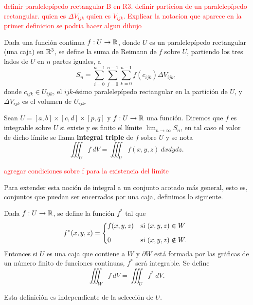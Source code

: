 \textcolor{red}{definir paralelep\'ipedo rectangular B en R3. }
\textcolor{red}{definir particion de un  paralelep\'ipedo rectangular. quien es $\Delta V_{ijk}$  quien es $V_{ijk}$. Explicar la notacion que aparece en la primer definicion }
\textcolor{red}{se podria hacer algun dibujo} 


\begin{definition}
Dada una funci\'on continua $f:U\to\mathbb{R}$, donde $U$ es un paralelep\'ipedo rectangular (una caja) en $\mathbb{R}^3$, se define la suma de Reimann de $f$ sobre $U$, partiendo los tres lados de $U$ en $n$ partes iguales, a
\[
    S_n=\sum_{i=0}^{n-1}\sum_{j=0}^{n-1}\sum_{k=0}^{n-1}f(c_{ijk})\Delta V_{ijk},
\]  
donde $c_{ijk}\in U_{ijk}$, el $ijk$-\'esimo paralelep\'ipedo rectangular en la partici\'on de $U$, y $\Delta V_{ijk}$ es el volumen de $U_{ijk}$.
\end{definition}

\begin{definition} 
    Sean $U=[a,b]\times[c,d]\times[p,q]$ y $f:U\to\mathbb{R}$ una funci\'on.  Diremos que $f$ es integrable sobre $U$ si existe y es finito el  l\'imite $\lim_{n\to\infty}S_n$, en tal caso  el valor de dicho l\'imite  se llama \textbf{integral triple} de $f$ sobre $U$ y se nota 
    \[
          \iiint_U f\:dV=\iiint_U f(x,y,z)\:dxdydz.
    \]
\end{definition}

\begin{obs}
\textcolor{red}{agregar condiciones sobre f para la  existencia del limite}
\end{obs}


Para extender esta noci\'on de integral a un conjunto acotado m\'as general, esto es, conjuntos que puedan ser encerrados por una caja, definimos lo siguiente. 

\begin{definition}
Dada $f:U\to\mathbb{R}$, se define la funci\'on $f^*$ tal que
\[
    f^*(x,y,z)=
    \begin{dcases*}
        f(x,y,z) & si $(x,y,z)\in W$ \\[.2cm]
        0        & si $(x,y,z)\notin W.$
    \end{dcases*}
\]
Entonces si $U$ es una caja que contiene a $W$ y $\partial W$ est\'a formada por las gr\'aficas de un n\'umero finito de funciones continuas, $f^*$ ser\'a integrable.  Se define
\[
    \iiint_W f\:dV=\iiint_U f^*\:dV.  
\]
\end{definition}

\begin{obs} 
   Esta definici\'on es independiente de la selecci\'on de $U$.
\end{obs}

